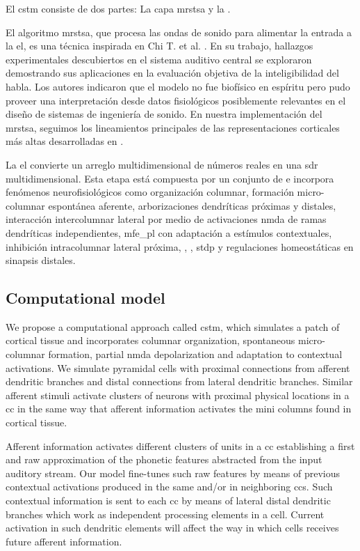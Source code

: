 {El \gls{cstm} consiste de dos partes: La capa \gls{mrstsa} y la .

El algoritmo \gls{mrstsa}, que procesa las ondas de sonido para alimentar la entrada a la \gls{el}, es una técnica inspirada en Chi T. et al. \cite{chi_2005}. En su trabajo, hallazgos experimentales descubiertos en el sistema auditivo central se exploraron demostrando sus aplicaciones en la evaluación objetiva de la inteligibilidad del habla. Los autores indicaron que el modelo no fue biofísico en espíritu pero pudo proveer una interpretación desde datos fisiológicos posiblemente relevantes en el diseño de sistemas de ingeniería de sonido. En nuestra implementación del \gls{mrstsa}, seguimos los lineamientos principales de las representaciones corticales más altas desarrolladas en \cite{chi_2005}.

La \gls{el} convierte un arreglo multidimensional de números reales en una \gls{sdr} multidimensional. Esta etapa está compuesta por un conjunto de  \cite{kohonen_2082, Kohonen:1989:SAM:69371} e incorpora fenómenos neurofisiológicos como organización columnar, formación micro-columnar espontánea aferente, arborizaciones dendríticas próximas y distales, interacción intercolumnar lateral por medio de activaciones \gls{nmda} de ramas dendríticas independientes, \gls{mfe_pl} con adaptación a estímulos contextuales, inhibición intracolumnar lateral próxima, , , \gls{stdp} y regulaciones homeostáticas en sinapsis distales.
}{
\subsection{Computational model}
\label{model-implementation}

We propose a computational approach called \gls{cstm}, which simulates a patch of cortical tissue and incorporates columnar organization, spontaneous micro-columnar formation, partial \gls{nmda} depolarization and adaptation to contextual activations. We simulate pyramidal cells with proximal connections from afferent dendritic branches and distal connections from lateral dendritic branches. Similar afferent stimuli activate clusters of neurons with proximal physical locations in a \gls{cc} in the same way that afferent information activates the mini columns found in cortical tissue.

Afferent information activates different clusters of units in a \gls{cc} establishing a first and raw approximation of the phonetic features abstracted from the input auditory stream. Our model fine-tunes such raw features by means of previous contextual activations produced in the same and/or in neighboring \glspl{cc}. Such contextual information is sent to each \gls{cc} by means of lateral distal dendritic branches which work as independent processing elements in a cell. Current activation in such dendritic elements will affect the way in which cells receives future afferent information.

}
